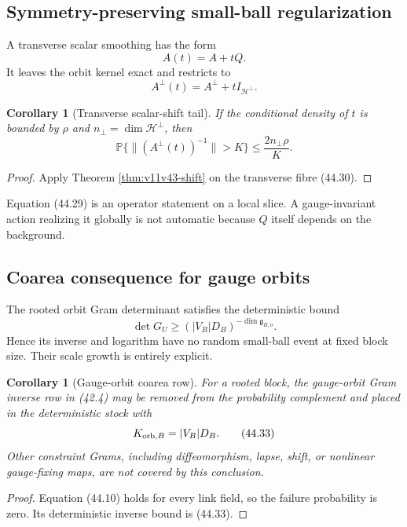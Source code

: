 \documentclass[11pt]{article}
\newtheorem{corollary}[theorem]{Corollary}
\begin{document}
\subsection{Symmetry-preserving small-ball regularization}

A transverse scalar smoothing has the form
\[
 A(t)=A+tQ.
 \tag{44.29}
\]
It leaves the orbit kernel exact and restricts to
\[
 A^\perp(t)=A^\perp+tI_{\mathcal H^\perp}.
 \tag{44.30}
\]

\begin{corollary}[Transverse scalar-shift tail]
\label{cor:v11v44-transverse-tail}
If the conditional density of \(t\) is bounded by \(\rho\) and
\(n_\perp=\dim\mathcal H^\perp\), then
\[
 \mathbb P\{
 \|(A^\perp(t))^{-1}\|>K
 \}
 \leq
 \frac{2n_\perp\rho}{K}.
 \tag{44.31}
\]
\end{corollary}

\begin{proof}
Apply Theorem \ref{thm:v11v43-shift} on the transverse fibre
(44.30).
\end{proof}

Equation (44.29) is an operator statement on a local slice.  A
gauge-invariant action realizing it globally is not automatic because
\(Q\) itself depends on the background.

\subsection{Coarea consequence for gauge orbits}

The rooted orbit Gram determinant satisfies the deterministic bound
\[
 \det G_U
 \geq
 (|V_B|D_B)^{-\dim\mathfrak g_{B,o}}.
 \tag{44.32}
\]
Hence its inverse and logarithm have no random small-ball event at fixed
block size.  Their scale growth is entirely explicit.

\begin{corollary}[Gauge-orbit coarea row]
\label{cor:v11v44-gauge-coarea}
For a rooted block, the gauge-orbit Gram inverse row in (42.4) may be
removed from the probability complement and placed in the deterministic
stock with
\[
 K_{{\rm orb},B}=|V_B|D_B.
 \tag{44.33}
\]
Other constraint Grams, including diffeomorphism, lapse, shift, or
nonlinear gauge-fixing maps, are not covered by this conclusion.
\end{corollary}

\begin{proof}
Equation (44.10) holds for every link field, so the failure probability
is zero.  Its deterministic inverse bound is (44.33).
\end{proof}
\end{document}

